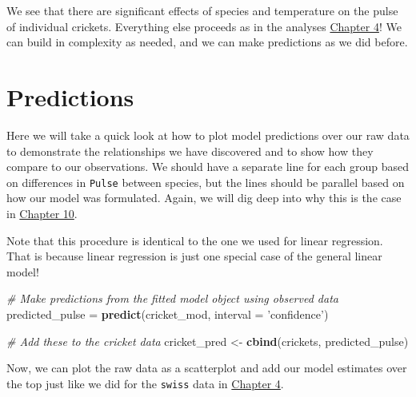 \documentclass[
]{book}
\newenvironment{Shaded}{\begin{snugshade}}{\end{snugshade}}
\newcommand{\CommentTok}[1]{\textcolor[rgb]{0.56,0.35,0.01}{\textit{#1}}}
\newcommand{\DataTypeTok}[1]{\textcolor[rgb]{0.13,0.29,0.53}{#1}}
\newcommand{\KeywordTok}[1]{\textcolor[rgb]{0.13,0.29,0.53}{\textbf{#1}}}
\newcommand{\NormalTok}[1]{#1}
\newcommand{\StringTok}[1]{\textcolor[rgb]{0.31,0.60,0.02}{#1}}
\begin{document}
We see that there are significant effects of species and temperature on the pulse of individual crickets. Everything else proceeds as in the analyses \protect\hyperlink{Chapter4}{Chapter 4}! We can build in complexity as needed, and we can make predictions as we did before.

\hypertarget{predictions}{%
\section{Predictions}\label{predictions}}

Here we will take a quick look at how to plot model predictions over our raw data to demonstrate the relationships we have discovered and to show how they compare to our observations. We should have a separate line for each group based on differences in \texttt{Pulse} between species, but the lines should be parallel based on how our model was formulated. Again, we will dig deep into why this is the case in \protect\hyperlink{Chapter10}{Chapter 10}.

Note that this procedure is identical to the one we used for linear regression. That is because linear regression is just one special case of the general linear model!

\begin{Shaded}
\begin{Highlighting}[]
\CommentTok{# Make predictions from the fitted model object using observed data}
\NormalTok{predicted_pulse =}\StringTok{ }\KeywordTok{predict}\NormalTok{(cricket_mod, }\DataTypeTok{interval =} \StringTok{'confidence'}\NormalTok{)}

\CommentTok{# Add these to the cricket data}
\NormalTok{cricket_pred <-}\StringTok{ }\KeywordTok{cbind}\NormalTok{(crickets, predicted_pulse)}
\end{Highlighting}
\end{Shaded}

Now, we can plot the raw data as a scatterplot and add our model estimates over the top just like we did for the \texttt{swiss} data in \protect\hyperlink{Chapter4}{Chapter 4}.
\end{document}
